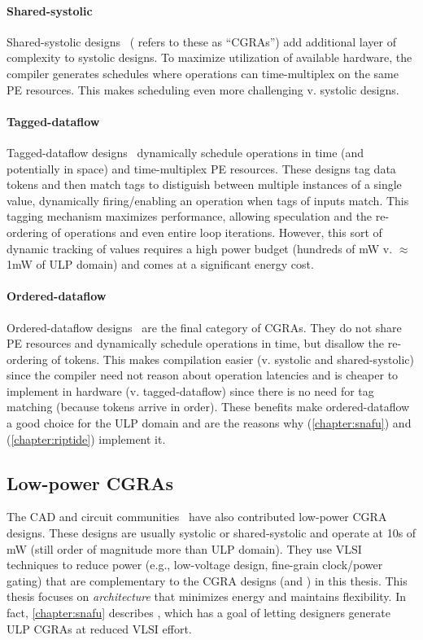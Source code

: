 \paragraph{Shared-systolic}
Shared-systolic designs~\cite{remarc,adres,morphosys,matrix,karunaratne2017hycube} (\cite{weng2020hybrid} refers to these as ``CGRAs'') add additional layer of complexity to systolic designs.
% 
To maximize utilization of available hardware, the compiler generates schedules where operations can time-multiplex on the same PE resources.
% 
This makes scheduling even more challenging v. systolic designs.

\paragraph{Tagged-dataflow}
Tagged-dataflow designs~\cite{swanson2003wavescalarvoitsechov2014single,ttda,trips,parashar2013triggered} dynamically schedule operations in time (and potentially in space) and time-multiplex PE resources.
% 
These designs tag data tokens and then match tags to distiguish between multiple instances of a single value, dynamically firing/enabling an operation when tags of inputs match.
% 
This tagging mechanism maximizes performance, allowing speculation and the re-ordering of operations and even entire loop iterations.
% 
However, this sort of dynamic tracking of values requires a high power budget (hundreds of mW v. $\approx$1mW of ULP domain) and comes at a significant energy cost.

\paragraph{Ordered-dataflow}
Ordered-dataflow designs~\cite{snafu,plasticine,dyser} are the final category of CGRAs.
% 
They do not share PE resources and dynamically schedule operations in time, but disallow the re-ordering of tokens.
% 
This makes compilation easier (v. systolic and shared-systolic) since the compiler need not reason about operation latencies and is cheaper to implement in hardware (v. tagged-dataflow) since there is no need for tag matching (because tokens arrive in order).
% 
These benefits make ordered-dataflow a good choice for the ULP domain and are the reasons why \snafu (\autoref{chapter:snafu}) and \riptide (\autoref{chapter:riptide}) implement it.

\subsection{Low-power CGRAs}
The CAD and circuit communities~\cite{ipa,cma,srp,karunaratne2017hycube} have also contributed low-power CGRA designs.
% 
These designs are usually systolic or shared-systolic and operate at 10s of mW (still order of magnitude more than ULP domain).
% 
They use VLSI techniques to reduce power (e.g., low-voltage design, fine-grain clock/power gating) that are complementary to the CGRA designs (\snafu and \riptide) in this thesis.
%
This thesis focuses on {\em architecture} that minimizes energy and maintains flexibility.
%
In fact, \autoref{chapter:snafu} describes \snafu, which has a goal of letting designers generate ULP CGRAs at reduced VLSI effort.

